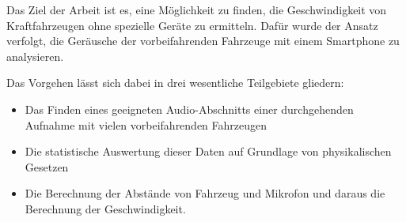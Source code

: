 Das Ziel der Arbeit ist es, eine Möglichkeit zu finden, die Geschwindigkeit von Kraftfahrzeugen ohne spezielle Geräte zu ermitteln. Dafür wurde der Ansatz verfolgt, die Geräusche der vorbeifahrenden Fahrzeuge mit einem Smartphone zu analysieren.

Das Vorgehen lässt sich dabei in drei wesentliche Teilgebiete gliedern:
\begin{itemize}
    \item Das Finden eines geeigneten Audio-Abschnitts einer durchgehenden Aufnahme mit vielen vorbeifahrenden Fahrzeugen
    \item Die statistische Auswertung dieser Daten auf Grundlage von physikalischen Gesetzen
    \item Die Berechnung der Abstände von Fahrzeug und Mikrofon und daraus die Berechnung der Geschwindigkeit.
\end{itemize}